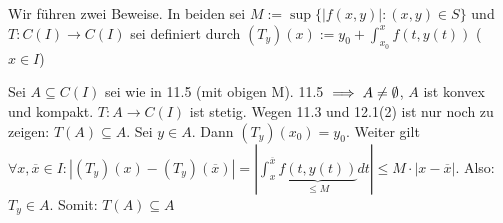 \documentclass[a4paper,twoside,DIV15,BCOR12mm]{scrbook}
\begin{document}
Wir führen zwei Beweise. In beiden sei $M := \sup \{|f(x,y)| : (x,y) \in S\}$ und $T: C(I) \to C(I)$ sei definiert durch
$(T_y)(x) := y_0 + \int_{x_0}^{x}f(t,y(t))$ ($x \in I$)

\begin{beweis}[mit 11.3]
Sei $A \subseteq C(I)$ sei wie in 11.5 (mit obigen M). 11.5 $\implies A \neq \emptyset$, $A$ ist konvex und kompakt. $T:A \to C(I)$ ist stetig. 
Wegen 11.3 und 12.1(2) ist nur noch zu zeigen: $T(A) \subseteq A$. Sei $y \in A$. Dann $(T_y)(x_0) = y_0$. Weiter gilt \\ 
$\forall x,\overline{x} \in I : | (T_y)(x) - (T_y)(\overline{x}) | = | \int_{x}^{\overline{x}} \underbrace{f(t,y(t))}_{\leq M} dt | \leq M \cdot |x-\overline{x}|$. 
Also: $T_y \in A.$ Somit: $T(A) \subseteq A$
\end{beweis}
\end{document}
